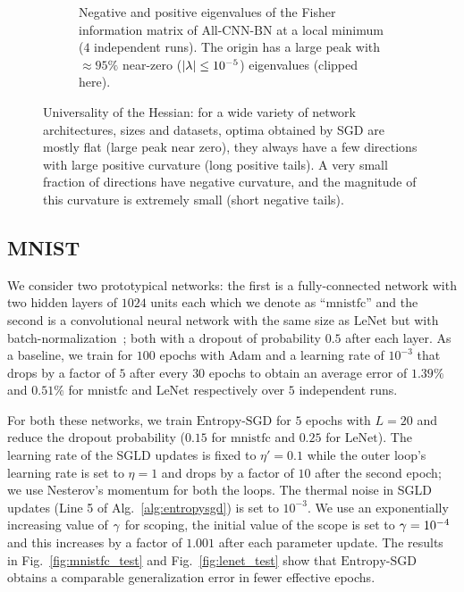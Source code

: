 \documentclass[10pt]{article}
\newcommand{\entropysgd}{\mathrm{Entropy}\textrm{-}\mathrm{SGD}}
\newcommand{\mnistfc}{\textrm{mnistfc}}
\newcommand{\lenet}{\textrm{LeNet}}
\newcommand{\allcnn}{\textrm{All-CNN-BN}}
\newcommand{\pc}[2]{{\color{ForestGreen}#1}\marginpar{\tiny\noindent{\raggedright{\color{Sienna}[PC]}\color{Sienna}{#2} \par}}}
\begin{document}
\begin{figure}[!tbh]
\begin{subfigure}[b]{\textwidth}
\begin{subfigure}[b]{0.44 \textwidth}
        \end{subfigure}
    \caption{\small Negative and positive eigenvalues of the Fisher information matrix of $\allcnn$ at a local minimum ($4$ independent runs). The origin has a large peak with $\approx 95\%$ near-zero ($\left| \lambda \right| \leq 10^{-5}$) eigenvalues (clipped here).}
    \label{fig:allcnn_hessian}
    \end{subfigure}
\caption{\small Universality of the Hessian: for a wide variety of network architectures, sizes and datasets, optima obtained by SGD are mostly flat (large peak near zero), they always have a few directions with large positive curvature (long positive tails). A very small fraction of directions have negative curvature, and the magnitude of this curvature is extremely small (short negative tails).}
\label{fig:universality}
\end{figure}

\subsection{MNIST}
\label{ss:expt:mnist}

We consider two prototypical networks: the first is a fully-connected network with two hidden layers of $1024$ units each which we denote as ``$\mnistfc$'' and the second is a convolutional neural network with the same size as $\lenet$ but with batch-normalization~\citep{ioffe2015batch}; both with a dropout of probability $0.5$ after each layer. As a baseline, we train for $100$ epochs with Adam and a learning rate of $10^{-3}$ that drops by a factor of $5$ after every $30$ epochs to obtain an average error of \pc{$1.39\%$ and $0.51\%$}{update std. dev numbers} for $\mnistfc$ and $\lenet$ respectively over $5$ independent runs.

For both these networks, we train $\entropysgd$ for $5$ epochs with $L = 20$ and reduce the dropout probability ($0.15$ for $\mnistfc$ and $0.25$ for $\lenet$). The learning rate of the SGLD updates is fixed to $\eta' = 0.1$ while the outer loop's learning rate is set to $\eta=1$ and drops by a factor of $10$ after the second epoch; we use Nesterov's momentum for both the loops. The thermal noise in SGLD updates (Line 5 of Alg.~\ref{alg:entropysgd}) is set to $10^{-3}$. We use an exponentially increasing value of $\gamma$ for scoping, the initial value of the scope is set to $\gamma = 10^{-4}$ and this increases by a factor of $1.001$ after each parameter update. The results in Fig.~\ref{fig:mnistfc_test} and Fig.~\ref{fig:lenet_test} show that $\entropysgd$ obtains a comparable generalization error \pc{in fewer effective epochs.}{massage}
\end{document}
